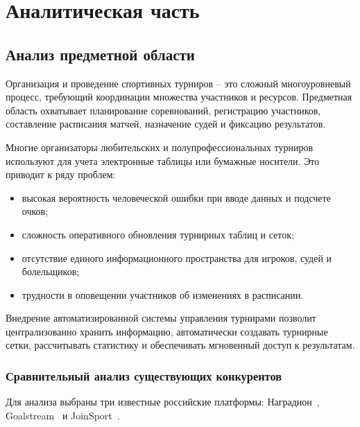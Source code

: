\chapter{Аналитическая часть}

\section{Анализ предметной области}
Организация и проведение спортивных турниров -- это сложный многоуровневый процесс, требующий координации множества участников и ресурсов. Предметная область охватывает планирование соревнований, регистрацию участников, составление расписания матчей, назначение судей и фиксацию результатов.

Многие организаторы любительских и полупрофессиональных турниров используют для учета электронные таблицы или бумажные носители. Это приводит к ряду проблем:
\begin{itemize}
	\item высокая вероятность человеческой ошибки при вводе данных и подсчете очков;
	\item сложность оперативного обновления турнирных таблиц и сеток;
	\item отсутствие единого информационного пространства для игроков, судей и болельщиков;
	\item трудности в оповещении участников об изменениях в расписании.
\end{itemize}

Внедрение автоматизированной системы управления турнирами позволит централизованно хранить информацию, автоматически создавать турнирные сетки, рассчитывать статистику и обеспечивать мгновенный доступ к результатам.

\subsection{Сравнительный анализ существующих конкурентов}
Для анализа выбраны три известные российские платформы: Наградион~\cite{nagradion}, Goalstream~\cite{goalstream} и JoinSport~\cite{joinsport}.

